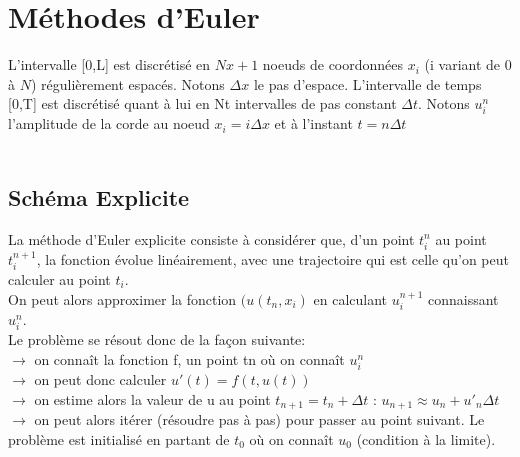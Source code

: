 \section{Méthodes d'Euler}

L'intervalle [0,L] est discrétisé en $Nx+1$ noeuds de coordonnées $x_{i}$ (i variant de 0 à $N$) régulièrement espacés. Notons $\Delta x$ le pas d'espace. L'intervalle de temps [0,T] est discrétisé quant à lui en Nt intervalles de pas constant $\Delta t$. Notons $u^{n}_{i}$ l'amplitude de la corde au noeud $x_{i} = i\Delta x$ et à l'instant $t = n\Delta t$\\\\

\subsection{Schéma Explicite}

La méthode d'Euler explicite consiste à considérer que, d'un point $t^n_{i}$ au point $t^{n+1}_{i}$, la fonction évolue linéairement, avec une trajectoire qui est celle qu'on peut calculer au point $t_i$.\\
On peut alors approximer la fonction $(u(t_n,x_i)$ en  calculant $u^{n+1}_{i}$ connaissant $u^n_{i}$.\\


Le problème se résout donc de la façon suivante:\\
$\rightarrow$ on connaît la fonction f, un point tn où on connaît $u^n_{i}$\\
$\rightarrow$ on peut donc calculer $u'(t)=f(t,u(t))$ \\
$\rightarrow$ on estime alors la valeur de u au point $t_{n+1} = t_n + \Delta t$ : $u_{n+1} \approx u_n + u'_n\Delta t$\\
$\rightarrow$ on peut alors itérer (résoudre pas à pas) pour passer au point suivant. Le problème est initialisé en partant de $t_0$ où on connaît $u_0$ (condition à la limite).\\


